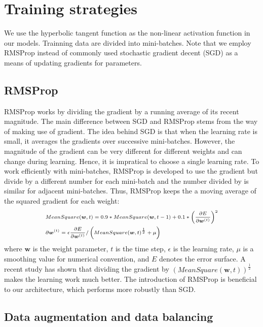 \documentclass[10pt,journal,twocolumn]{IEEEtran}
\def\bw{{\boldsymbol w}}
\begin{document}
\section{Training strategies}\label{sec:training}

We use the hyperbolic tangent function as the non-linear activation function in our models.
Trainning data are divided into mini-batches. Note that we employ RMSProp \cite{rmsprop} instead of commonly used stochastic gradient decent (SGD) as a means of updating gradients for parameters.

\subsection{RMSProp}
RMSProp works by dividing the gradient by a running average of its recent magnitude.  The main difference between SGD and RMSProp stems from the way of making use of gradient. The idea behind SGD is that when the learning rate is small, it averages the gradients over successive mini-batches. However, the magnitude of the gradient can be very different for different weights and can change during learning. Hence, it is impratical to choose a single learning rate. To work efficiently with mini-batches, RMSProp is developed to use the gradient but divide by a different number for each mini-batch and the number divided by is similar for adjacent mini-batches.
Thus, RMSProp keeps the a moving average of the squared gradient for each weight:
\begin{equation}\scriptsize
\begin{aligned}
& MeanSquare(\bw,t)=0.9*MeanSquare(\bw,t-1) + 0.1* \left(\frac{\partial E}{\partial \bw^{(t)}}\right)^2\\\nonumber
& \partial \bw^{(t)}=\epsilon \frac{\partial E}{\partial \bw^{(t)}}/\left( MeanSquare(\bw,t)^{\frac{1}{2}}+ \mu \right)
\end{aligned}
\end{equation}
where $\bw$ is the weight parameter, $t$ is the time step, $\epsilon$ is the learning rate, $\mu$ is a smoothing value for numerical convention, and $E$ denotes the error surface. A recent study \cite{rmsprop} has shown that dividing the gradient by $\left(MeanSquare(\bw,t)\right)^{\frac{1}{2}}$  makes the learning work much better.  The introduction of RMSProp is beneficial to our architecture, which performs more robustly than SGD.

\subsection{Data augmentation and data balancing}
\end{document}
